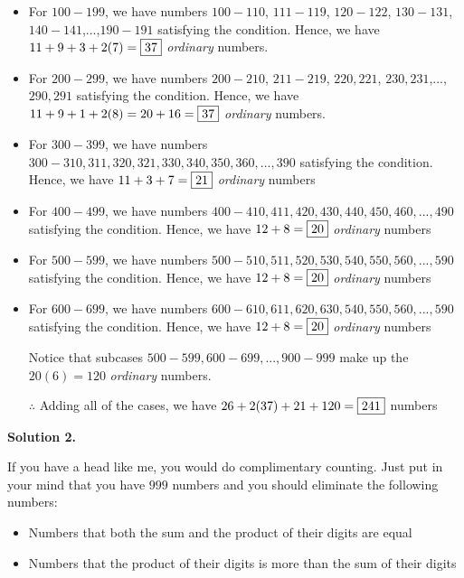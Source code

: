 \documentclass[11pt,paper=letter]{scrartcl}
\newcommand{\soln}[1]{{\sffamily \bfseries Solution #1.}\;}
\begin{document}
\begin{itemize}
    \item For $100-199$, we have numbers $100-110$, $111 - 119$, $120-122$, $130-131$, $140-141$,...,$190-191$ satisfying the condition. Hence, we have $11 + 9 + 3 + 2(7) = \fbox{37}$ \textit{ordinary} numbers.
    
    \item For $200-299$, we have numbers $200-210$, $211 - 219$, $220, 221$, $230,231$,...,$290,291$ satisfying the condition. Hence, we have $11 + 9 + 1 + 2(8) = 20 + 16 = \fbox{37}$ \textit{ordinary} numbers.
    
    \item For $300-399$, we have numbers $300-310, 311, 320, 321, 330, 340, 350, 360,...,390$ satisfying the condition. Hence, we have $11+3+7=\fbox{21}$ \textit{ordinary} numbers
    
    \item For $400-499$, we have numbers $400-410, 411, 420, 430, 440, 450, 460,...,490$ satisfying the condition. Hence, we have $12+8=\fbox{20}$ \textit{ordinary} numbers
    
    \item For $500-599$, we have numbers $500-510, 511, 520, 530, 540, 550, 560,...,590$ satisfying the condition. Hence, we have $12+8=\fbox{20}$ \textit{ordinary} numbers
    
     \item For $600-699$, we have numbers $600-610, 611, 620, 630, 540, 550, 560,...,590$ satisfying the condition. Hence, we have $12+8=\fbox{20}$ \textit{ordinary} numbers
    
    Notice that subcases $500-599,600-699,...,900-999$ make up the $20(6) =120$ \textit{ordinary} numbers. 
    
    $\therefore$ Adding all of the cases, we have $26 + 2(37) + 21 + 120 = \fbox{241}$ numbers
\end{itemize}

\soln2

If you have a head like me, you would do complimentary counting. Just put in your mind that you have $999$ numbers and you should eliminate the following numbers:

\begin{itemize}
    \item Numbers that both the sum and the product of their digits are equal
    
    \item Numbers that the product of their digits is more than the sum of their digits
\end{itemize}
\end{document}
